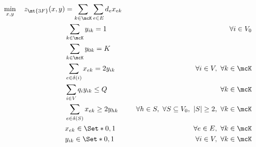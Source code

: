 \begin{align}
	\min_{x, y} \quad z_\mt{3F}(x, y) & = \sum_{k \in \mcK} \sum_{e \in E} d_{e} x_{ek} \label{eq:three-index-flow-obj-func}                                                                                                                               \\
	                                  & \sum_{k \in \mcK} y_{ik} = 1                                                         & \quad \forall i \in V_0                                              \label{eq:three-index-flow-all-customers-visited}      \\
	                                  & \sum_{k \in \mcK} y_{0k} = K                                                         & \label{eq:three-index-flow-tour-starts-and-ends-at-depot}                                                                   \\
	                                  & \sum_{e \in \delta(i)} x_{ek} = 2 y_{ik}                                          & \quad \forall i \in V,\ \forall k \in \mcK \label{eq:three-index-flow-force-visited-customer-if-flow}                          \\
	                                  & \sum_{i \in V} q_i y_{ik} \le Q                                                   & \quad \forall k \in \mcK \label{eq:three-index-flow-force-resource-upper-bound}                                                \\
	                                  & \sum_{e \in \delta(S)} x_{ek} \ge 2 y_{hk}                                        & \quad \forall h \in S,\ \forall S \subseteq V_0,\ |S| \ge 2,\ \forall k \in \mcK \label{eq:three-index-flow-secv1} \\
	                                  & x_{ek}                   \in \Set*{0, 1}                                          & \quad \forall e \in E,\ \forall k \in \mcK             \label{eq:three-index-flow-x-mip-var-bounds}                            \\
	                                  & y_{ik}                    \in \Set*{0, 1}                                         & \quad \forall i \in V,\ \forall k \in \mcK  \label{eq:three-index-flow-y-mip-var-bounds}
\end{align}

